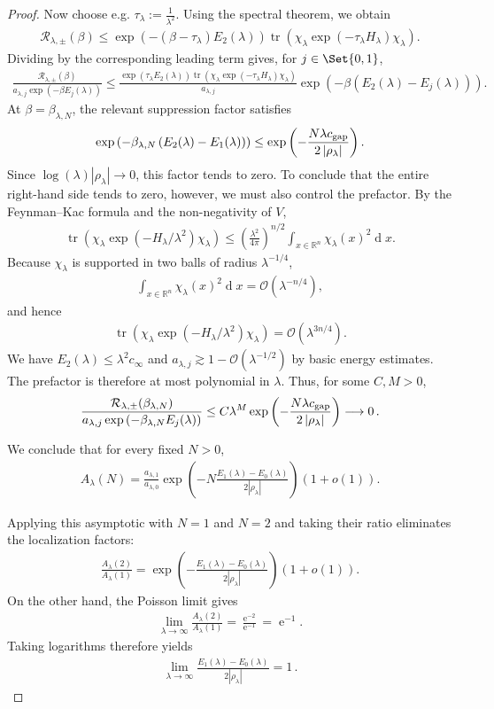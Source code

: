 \documentclass[a4paper,10pt]{article}
\numberwithin{equation}{section}
\theoremstyle{plain}
\theoremstyle{plain}
\theoremstyle{plain}
\theoremstyle{plain}
\theoremstyle{plain}
\theoremstyle{remark}
\theoremstyle{definition}
\newcommand{\ee}{\operatorname{e}}
\newcommand{\RR}{\mathbb{R}}
\newcommand{\calO}{\mathcal{O}}
\newcommand{\calR}{\mathcal{R}}
\newcommand{\Ord}[1]{\calO\left(#1\right)}
\newcommand{\dif}{\operatorname{d}\!} %
\newcommand{\tr}{\operatorname{tr}}
\newcommand{\abs}[1]{\left\lvert#1\right\rvert}
\newcommand{\eq}[1]{\begin{align*}#1\end{align*}}
\newcommand{\br}[1]{\left(#1\right)}
\begin{document}
\begin{proof}
Now choose e.g.
$\tau_\lambda:=\frac{1}{\lambda^2}$.
Using the spectral theorem, we obtain
\eq{
\calR_{\lambda,\pm}(\beta)
\leq
\exp\br{
-\br{\beta-\tau_\lambda}E_2(\lambda)
}
\tr\br{
\chi_\lambda
\exp\br{-\tau_\lambda H_\lambda}
\chi_\lambda
}.
}
Dividing by the corresponding leading term gives, for
$j\in\Set{0,1}$,
\eq{
\frac{
\calR_{\lambda,\pm}(\beta)
}{
a_{\lambda,j}\exp\br{-\beta E_j(\lambda)}
}
\leq
\frac{
\exp\br{\tau_\lambda E_2(\lambda)}
\tr\br{
\chi_\lambda
\exp\br{-\tau_\lambda H_\lambda}
\chi_\lambda
}
}{
a_{\lambda,j}
}
\exp\br{
-\beta\br{E_2(\lambda)-E_j(\lambda)}
}.
}
At $\beta=\beta_{\lambda,N}$, the relevant suppression factor satisfies
\eq{
\exp\br{
-\beta_{\lambda,N}
\br{E_2(\lambda)-E_1(\lambda)}
}
\leq
\exp\br{
-\frac{N \lambda c_{\rm gap}}{2\abs{\rho_\lambda}}
}.
}
Since $\log(\lambda)\abs{\rho_\lambda}\to0$, this factor tends to zero. To conclude that
the entire right-hand side tends to zero, however, we must also
control the prefactor. By the Feynman--Kac formula and the non-negativity of $V$,
\eq{
\tr\br{
\chi_\lambda
\exp\br{-H_\lambda/\lambda^2}
\chi_\lambda
}
\leq
\br{\frac{\lambda^2}{4\pi}}^{n/2}
\int_{x\in\RR^n}\chi_\lambda(x)^2\dif{x}.
}
Because $\chi_\lambda$ is supported in two balls of radius
$\lambda^{-1/4}$,
\eq{
\int_{x\in\RR^n}\chi_\lambda(x)^2\dif{x}
=
\Ord{\lambda^{-n/4}},
}
and hence
\eq{
\tr\br{
\chi_\lambda
\exp\br{-H_\lambda/\lambda^2}
\chi_\lambda
}
=
\Ord{\lambda^{3n/4}}.
}
We have $E_2(\lambda)\leq\lambda^2 c_{\infty}$ and
$a_{\lambda,j}\gtrsim1-\calO(\lambda^{-1/2})$ by basic energy estimates. The prefactor is therefore at most
polynomial in $\lambda$. Thus, for some $C,M>0$,
\eq{
\frac{
\calR_{\lambda,\pm}(\beta_{\lambda,N})
}{
a_{\lambda,j}
\exp\br{-\beta_{\lambda,N}E_j(\lambda)}
}
\leq
C\lambda^M
\exp\br{
-\frac{N \lambda c_{\rm gap}}{2\abs{\rho_\lambda}}
}
\longrightarrow0\,.
}

We conclude that for every fixed
$N>0$,
\eq{
A_\lambda(N)
=
\frac{a_{\lambda,1}}{a_{\lambda,0}}
\exp\br{
-N\frac{E_1(\lambda)-E_0(\lambda)}
        {2\abs{\rho_\lambda}}
}
\br{1+o(1)}.
}

Applying this asymptotic with $N=1$ and $N=2$ and taking
their ratio eliminates the localization factors:
\eq{
\frac{A_\lambda(2)}{A_\lambda(1)}
=
\exp\br{
-\frac{E_1(\lambda)-E_0(\lambda)}
       {2\abs{\rho_\lambda}}
}
\br{1+o(1)}.
}
On the other hand, the Poisson limit gives
\eq{
\lim_{\lambda\to\infty}
\frac{A_\lambda(2)}{A_\lambda(1)}
=
\frac{\ee^{-2}}{\ee^{-1}}
=
\ee^{-1}.
}
Taking logarithms therefore yields
\eq{
\lim_{\lambda\to\infty}
\frac{E_1(\lambda)-E_0(\lambda)}
     {2\abs{\rho_\lambda}}
=
1\,.
}
\end{proof}
\end{document}
